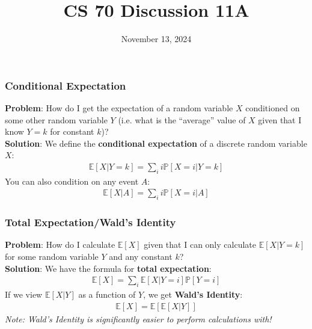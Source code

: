 \documentclass{beamer}
\title{CS 70 Discussion 11A}
\date{November 13, 2024}
\begin{document}
\frame{\titlepage}

\begin{frame}
    \frametitle{Conditional Expectation}
    {\bf Problem}: How do I get the expectation of a random variable $X$ conditioned on some other random variable $Y$ (i.e. what is the ``average'' value of $X$ given that I know $Y=k$ for constant $k$)?\\
    {\bf Solution}: We define the {\bf conditional expectation} of a discrete random variable $X$:
    \begin{align*}
        \mathbb{E}[X|Y=k]=\sum_{i} i\mathbb{P}[X=i|Y=k]
    \end{align*}
    You can also condition on any event $A$:
    \begin{align*}
        \mathbb{E}[X|A]=\sum_{i}i\mathbb{P}[X=i|A]
    \end{align*}
\end{frame}

\begin{frame}
    \frametitle{Total Expectation/Wald's Identity}
    {\bf Problem}: How do I calculate $\mathbb{E}[X]$ given that I can only calculate $\mathbb{E}[X|Y=k]$ for some random variable $Y$ and any constant $k$?\\
    {\bf Solution}: We have the formula for {\bf total expectation}:
    \begin{align*}
        \mathbb{E}[X]=\sum_{i}\mathbb{E}[X|Y=i]\mathbb{P}[Y=i]
    \end{align*}
    If we view $\mathbb{E}[X|Y]$ as a function of $Y$, we get {\bf Wald's Identity}:
    \begin{align*}
        \mathbb{E}[X]=\mathbb{E}[\mathbb{E}[X|Y]]
    \end{align*}
    {\it Note: Wald's Identity is significantly easier to perform calculations with!}
\end{frame}
\end{document}

